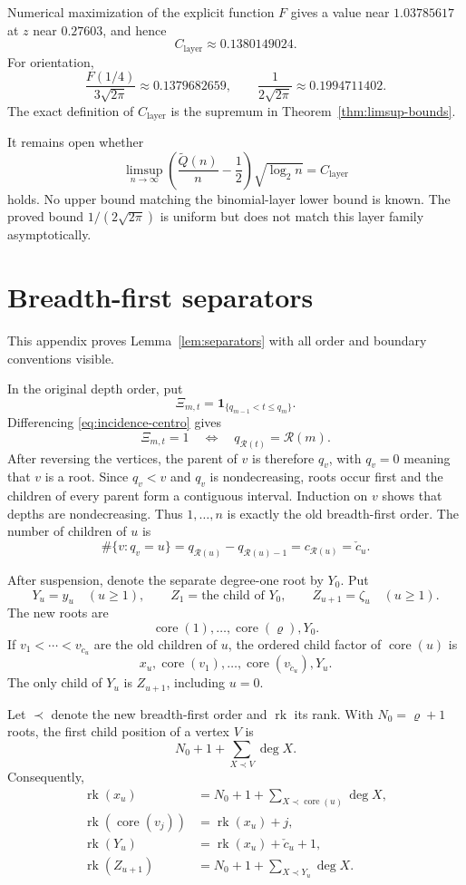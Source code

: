 \documentclass[11pt]{article}
\theoremstyle{definition}
\theoremstyle{remark}
\newcommand{\Qt}{\widetilde Q}
\begin{document}
Numerical maximization of the explicit function \(F\) gives a value near
\(1.03785617\) at
\(z\) near \(0.27603\), and hence
\[
 C_{\mathrm{layer}}\approx0.1380149024.
\]
For orientation,
\[
 \frac{F(1/4)}{3\sqrt{2\pi}}\approx0.1379682659,
 \qquad
 \frac1{2\sqrt{2\pi}}\approx0.1994711402.
\]
The exact definition of \(C_{\mathrm{layer}}\) is the supremum in
Theorem~\ref{thm:limsup-bounds}.

It remains open whether
\[
 \limsup_{n\to\infty}
 \left(\frac{\Qt(n)}n-\frac12\right)\sqrt{\log_2 n}
 =C_{\mathrm{layer}}
\]
holds.  No upper bound matching the binomial-layer lower bound is known.  The
proved bound \(1/(2\sqrt{2\pi})\) is uniform but does not match this layer
family asymptotically.

\appendix
{}

\section{Breadth-first separators}
\label{app:separators}

This appendix proves Lemma~\ref{lem:separators} with all order and boundary
conventions visible.

In the original depth order, put
\[
 \Xi_{m,t}=\mathbf1_{\{q_{m-1}<t\leq q_m\}}.
\]
Differencing \eqref{eq:incidence-centro} gives
\[
 \Xi_{m,t}=1
 \quad\Longleftrightarrow\quad
 q_{\mathcal R(t)}=\mathcal R(m).
\]
After reversing the vertices, the parent of \(v\) is therefore \(q_v\), with
\(q_v=0\) meaning that \(v\) is a root.  Since \(q_v<v\) and \(q_v\) is
nondecreasing, roots occur first and the children of every parent form a
contiguous interval.  Induction on \(v\) shows that depths are nondecreasing.
Thus \(1,\ldots,n\) is exactly the old breadth-first order.  The number of
children of \(u\) is
\[
 \#\{v:q_v=u\}
 =q_{\mathcal R(u)}-q_{\mathcal R(u)-1}
 =c_{\mathcal R(u)}=\check c_u.
\]

After suspension, denote the separate degree-one root by \(Y_0\).  Put
\[
 Y_u=y_u\quad(u\geq1),
 \qquad Z_1=\text{the child of }Y_0,
 \qquad Z_{u+1}=\zeta_u\quad(u\geq1).
\]
The new roots are
\[
 \operatorname{core}(1),\ldots,\operatorname{core}(\varrho),Y_0.
\]
If \(v_1<\cdots<v_{\check c_u}\) are the old children of \(u\), the ordered child
factor of \(\operatorname{core}(u)\) is
\[
 x_u,\operatorname{core}(v_1),\ldots,\operatorname{core}(v_{\check c_u}),Y_u.
\]
The only child of \(Y_u\) is \(Z_{u+1}\), including \(u=0\).

Let \(\prec\) denote the new breadth-first order and \(\operatorname{rk}\)
its rank.  With \(N_0=\varrho+1\) roots, the first child position of a vertex
\(V\) is
\[
 N_0+1+\sum_{X\prec V}\deg X.
\]
Consequently,
\begin{align*}
 \operatorname{rk}(x_u)
 &=N_0+1+\sum_{X\prec \operatorname{core}(u)}\deg X,\\
 \operatorname{rk}(\operatorname{core}(v_j))
 &=\operatorname{rk}(x_u)+j,\\
 \operatorname{rk}(Y_u)
 &=\operatorname{rk}(x_u)+\check c_u+1,\\
 \operatorname{rk}(Z_{u+1})
 &=N_0+1+\sum_{X\prec Y_u}\deg X.
\end{align*}
\end{document}
